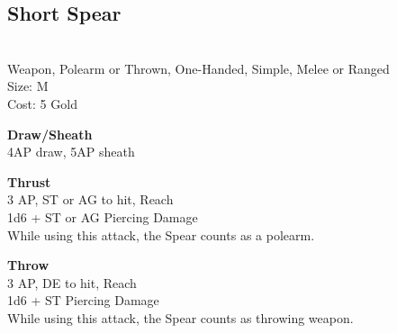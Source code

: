\subsection{Short Spear}\label{weapon:shortSpear}\\
Weapon, Polearm or Thrown, One-Handed, Simple, Melee or Ranged\\
Size: M\\
Cost: 5 Gold

\textbf{Draw/Sheath}\\
4AP draw, 5AP sheath

\textbf{Thrust}\\
3 AP, ST or AG to hit,  Reach\\
1d6 + \texttimes ST or AG Piercing Damage\\
While using this attack, the Spear counts as a polearm.

\textbf{Throw}\\
3 AP, DE to hit,  Reach\\
1d6 + \texttimes ST Piercing Damage\\
While using this attack, the Spear counts as throwing weapon.

